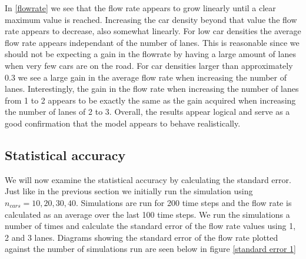\documentclass[a4paper,12pt]{article}
\begin{document}
In \ref*{flowrate} we see that the flow rate appears to grow linearly until a clear maximum value is reached. Increasing the car density beyond
that value the flow rate appears to decrease, also somewhat linearly. For low car densities the average flow rate appears independant of the number of lanes.
This is reasonable since we should not be expecting a gain in the flowrate by having a large amount of lanes when very few cars are on the road.
For car densities larger than approximately 0.3 we see a large gain in the average flow rate when increasing the number of lanes. Interestingly, the gain in the
flow rate when increasing the number of lanes from 1 to 2 appears to be exactly the same as the gain acquired when increasing the number of lanes of 2 to 3.
Overall, the results appear logical and serve as a good confirmation that the model appears to behave realistically.

\subsection*{Statistical accuracy}
We will now examine the statistical accuracy by calculating the standard error. Just like in the previous section we initially run the simulation
using $n_{cars}=10, 20, 30, 40$. Simulations are run for 200 time steps and the flow rate is calculated as an average over the last 100 time steps.
We run the simulations a number of times and calculate the standard error of the flow rate values using 1, 2 and 3 lanes. Diagrams showing the
standard error of the flow rate plotted against the number of simulations run are seen below in figure \ref*{standard error 1}
\end{document}

